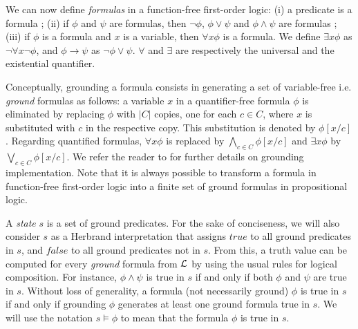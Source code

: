 \documentclass[letterpaper]{article} %
\begin{document}
We can now define {\it formulas} in a function-free first-order logic: (i) a predicate is a formula ; (ii) if ${\phi}$ and ${\psi}$ are formulas, then $\neg \phi$, $\phi \vee \psi$ and $\phi \wedge \psi$ are formulas ; (iii) if $\phi$ is a formula and $x$ is a variable, then $\forall x \phi$ is a formula. We define $\exists x \phi$ as $\neg \forall x \neg \phi$, and $\phi \rightarrow \psi$ as $\neg \phi \vee \psi$. $\forall$ and $\exists$ are respectively the universal and the existential quantifier.

Conceptually, grounding a formula consists in generating a set of variable-free i.e. {\it ground} formulas \cite{helmert} as follows: a variable $x$ in a quantifier-free formula $\phi$ is eliminated by replacing $\phi$ with $|C|$ copies, one for each $c \in C$, where $x$ is substituted with $c$ in the respective copy. This substitution is denoted by $\phi[x/c]$. Regarding quantified formulas, $\forall x \phi$ is replaced by $\bigwedge_{c \in C} \phi[x/c]$ and $\exists x \phi$ by $\bigvee_{c \in C} \phi[x/c]$. We refer the reader to \cite{behnke20,ramoul17} for further details on grounding implementation. Note that it is always possible to transform a formula in function-free first-order logic into a finite set of ground formulas in propositional logic.

A {\it state} $s$ is a set of ground predicates. For the sake of conciseness, we will also consider $s$ as a Herbrand interpretation that assigns $true$ to all ground predicates in $s$, and $false$ to all ground predicates not in $s$. From this, a truth value can be computed for every {\it ground} formula from ${\cal{L}}$ by using the usual rules for logical composition. For instance, $\phi \wedge \psi$ is true in $s$ if and only if both $\phi$ and $\psi$ are true in $s$. Without loss of generality, a formula (not necessarily ground) $\phi$ is true in $s$ if and only if grounding $\phi$ generates at least one ground formula true in $s$. We will use the notation $s \models \phi$ to mean that the formula $\phi$ is true in $s$.

\end{document}
